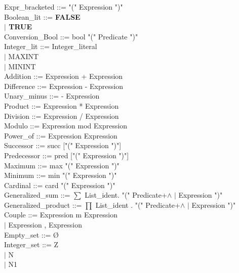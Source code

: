 \documentclass[12pt,a4paper,draft]{article}
\begin{document}
{\begin{sloppypar}
Expr\_bracketed  ::= "(" Expression ")" \\
Boolean\_lit   ::=  \textbf{FALSE\\
   \hspace*{0.20in} $|$  TRUE}\\
Conversion\_Bool  ::= bool   "(" Predicate ")" \\
Integer\_lit   ::= Integer\_literal \\
   \hspace*{0.20in} $|$  MAXINT\\
   \hspace*{0.20in} $|$  MININT\\
Addition   ::=  Expression + Expression \\
Difference   ::=  Expression - Expression \\
Unary\_minus  ::= - Expression \\
Product   ::=  Expression * Expression \\
Division   ::=  Expression / Expression \\
Modulo   ::=  Expression mod Expression \\
Power\_of   ::=  Expression Expression \\
Successor   ::=  succ ["(" Expression ")"] \\
Predecessor   ::=  pred ["(" Expression ")"] \\
Maximum   ::=  max "(" Expression ")" \\
Minimum   ::=  min "(" Expression ")" \\
Cardinal   ::= card "(" Expression ")" \\
Generalized\_sum  ::=  $ \sum $ List\_ident. "(" Predicate+$\land$ $|$ Expression ")" \\
Generalized\_product ::=  $\prod$ List\_ident . "(" Predicate+$\land$ $|$ Expression ")" \\
Couple   ::=  Expression m Expression \\
\hspace*{0.20in}   $|$  Expression , Expression \\
Empty\_set   ::=  Ø\\
Integer\_set   ::=  Z\\
  \hspace*{0.20in} $|$  N\\
  \hspace*{0.20in} $|$  N1\\

\end{sloppypar}}
\end{document}
